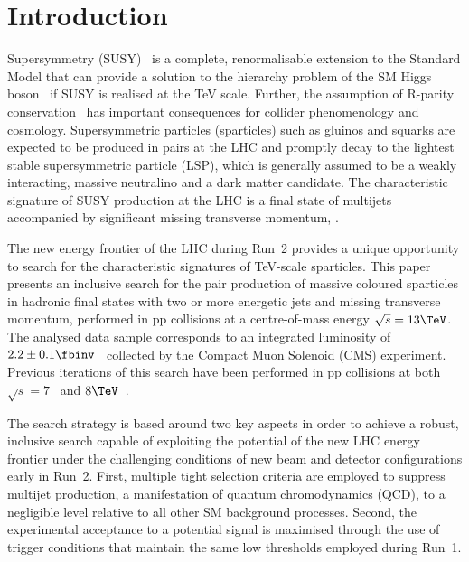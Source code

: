 \section{Introduction}
\label{sec:introduction}

Supersymmetry (SUSY)~\cite{ref:SUSY-1, ref:SUSY0, ref:SUSY1,
  ref:SUSY2, ref:SUSY3, ref:SUSY4, ref:hierarchy1, ref:hierarchy2}
is a complete, renormalisable extension to the Standard Model
that can provide a solution to the hierarchy problem of the SM Higgs
boson~\cite{ref:atlashiggsdiscovery, ref:cmshiggsdiscovery} if
SUSY is realised at the TeV scale. Further, the assumption of R-parity
conservation~\cite{Farrar:1978xj} has important consequences for
collider phenomenology and cosmology. Supersymmetric particles
(sparticles) such as gluinos and squarks are expected to be produced
in pairs at the LHC and promptly decay to the lightest stable
supersymmetric particle (LSP), which is generally assumed to be a
weakly interacting, massive neutralino and a dark matter
candidate. The characteristic signature of SUSY production at the LHC
is a final state of multijets accompanied by significant missing
transverse momentum, \ptvecmiss.

The new energy frontier of the LHC during Run~2 provides a unique
opportunity to search for the characteristic signatures of TeV-scale
sparticles. This paper presents an inclusive search
for the pair production of massive coloured sparticles in hadronic
final states with two or more energetic jets and missing transverse
momentum, performed in pp collisions at a centre-of-mass energy
$\sqrt{s} = 13\TeV$. The analysed data sample corresponds to an
integrated luminosity of $2.2 \pm 0.1 \fbinv$~\cite{lumi} collected by
the Compact Muon Solenoid (CMS) experiment. Previous iterations of
this search have been performed in pp collisions at both $\sqrt{s} =
7$~\cite{RA1Paper, RA1Paper2011, RA1Paper2011FULL} and
$8\TeV$~\cite{RA1Paper2012}.

The search strategy is based around two key aspects in order to
achieve a robust, inclusive search capable of exploiting the potential
of the new LHC energy frontier under the challenging conditions of new
beam and detector configurations early in Run~2. First, multiple tight
selection criteria are employed to suppress multijet production, a
manifestation of quantum chromodynamics (QCD), to a negligible level
relative to all other SM background processes. Second, the
experimental acceptance to a potential signal is maximised through the
use of trigger conditions that maintain the same low thresholds
employed during Run~1.


